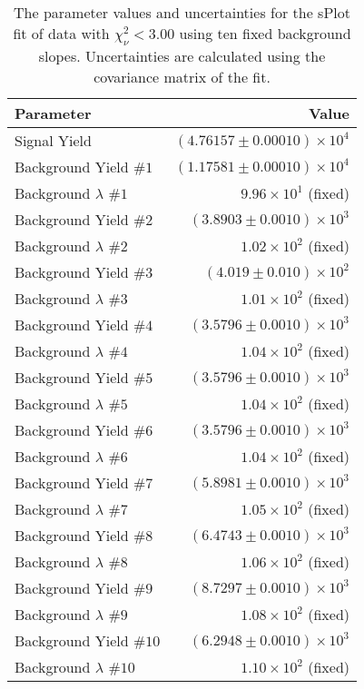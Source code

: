 
\begin{table}[ht]
    \begin{center}
        \begin{tabular}{lr}\toprule
            Parameter & Value \\\midrule
            Signal Yield & $(4.76157 \pm 0.00010) \times 10^{4}$ \\
            Background Yield $\#1$ & $(1.17581 \pm 0.00010) \times 10^{4}$ \\
            Background $\lambda$ $\#1$ & $9.96 \times 10^{1}$ (fixed) \\
            Background Yield $\#2$ & $(3.8903 \pm 0.0010) \times 10^{3}$ \\
            Background $\lambda$ $\#2$ & $1.02 \times 10^{2}$ (fixed) \\
            Background Yield $\#3$ & $(4.019 \pm 0.010) \times 10^{2}$ \\
            Background $\lambda$ $\#3$ & $1.01 \times 10^{2}$ (fixed) \\
            Background Yield $\#4$ & $(3.5796 \pm 0.0010) \times 10^{3}$ \\
            Background $\lambda$ $\#4$ & $1.04 \times 10^{2}$ (fixed) \\
            Background Yield $\#5$ & $(3.5796 \pm 0.0010) \times 10^{3}$ \\
            Background $\lambda$ $\#5$ & $1.04 \times 10^{2}$ (fixed) \\
            Background Yield $\#6$ & $(3.5796 \pm 0.0010) \times 10^{3}$ \\
            Background $\lambda$ $\#6$ & $1.04 \times 10^{2}$ (fixed) \\
            Background Yield $\#7$ & $(5.8981 \pm 0.0010) \times 10^{3}$ \\
            Background $\lambda$ $\#7$ & $1.05 \times 10^{2}$ (fixed) \\
            Background Yield $\#8$ & $(6.4743 \pm 0.0010) \times 10^{3}$ \\
            Background $\lambda$ $\#8$ & $1.06 \times 10^{2}$ (fixed) \\
            Background Yield $\#9$ & $(8.7297 \pm 0.0010) \times 10^{3}$ \\
            Background $\lambda$ $\#9$ & $1.08 \times 10^{2}$ (fixed) \\
            Background Yield $\#10$ & $(6.2948 \pm 0.0010) \times 10^{3}$ \\
            Background $\lambda$ $\#10$ & $1.10 \times 10^{2}$ (fixed) \\\bottomrule
        \end{tabular}
        \caption{The parameter values and uncertainties for the sPlot fit of data with $\chi^2_\nu < 3.00$ using ten fixed background slopes. Uncertainties are calculated using the covariance matrix of the fit.}\label{tab:splot-fit-results-chisqdof-3.00-fixed-10}
    \end{center}
\end{table}
